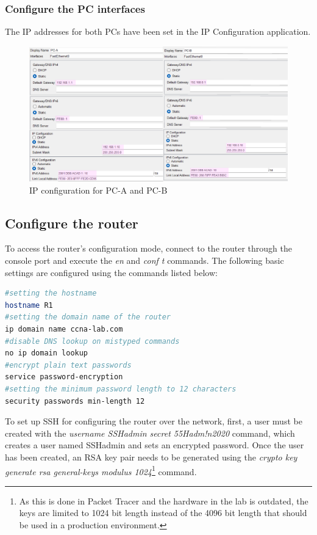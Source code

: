 \documentclass[a4paper]{article}
\newcommand{\abc}{\hfill \break}
\newcommand{\ii}{\textit}
\begin{document}
\subsubsection{Configure the PC interfaces}
The IP addresses for both PCs have been set in the IP Configuration application.
\begin{figure}[h]
	\includegraphics[scale=0.45]{images/pc-ipconf.png}
	\centering
	\caption{IP configuration for PC-A and PC-B}
\end{figure}
\newpage
\subsection{Configure the router}
To access the router's configuration mode, connect to the router through the console port and execute the \ii{en} and \ii{conf t} commands.\abc
The following basic settings are configured using the commands listed below:
\begin{lstlisting}[language=bash,
	keywordstyle=\color{black},
	rulecolor=\color{blue}]
#setting the hostname
hostname R1
#setting the domain name of the router
ip domain name ccna-lab.com
#disable DNS lookup on mistyped commands
no ip domain lookup
#encrypt plain text passwords
service password-encryption
#setting the minimum password length to 12 characters
security passwords min-length 12
\end{lstlisting}
To set up SSH for configuring the router over the network, first, a user must be created with the \ii{username SSHadmin secret 55Hadm!n2020} command, which creates a user named SSHadmin and sets an encrypted password.\abc
Once the user has been created, an RSA key pair needs to be generated using the \ii{crypto key generate rsa general-keys modulus 1024}\footnote{As this is done in Packet Tracer and the hardware in the lab is outdated, the keys are limited to 1024 bit length instead of the 4096 bit length that should be used in a production environment.} command.
\end{document}
